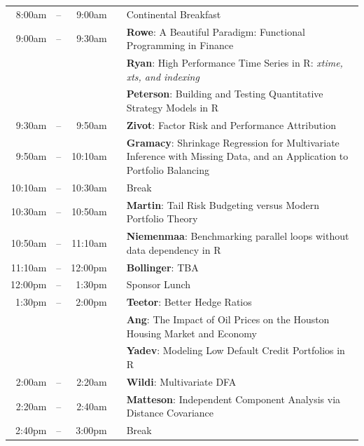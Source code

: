 \documentclass[11pt]{article}
\newcommand{\mylinecolor}[1]{\color{#1}\vspace{-8pt}}  %
\begin{document}
\begin{tabular}{rlrlp{5in}}
  8:00am  & -- &  9:00am &   & \small{\mylinecolor{Breaks} Continental Breakfast}  \\
   9:00am & -- &  9:30am &   & \textbf{\color{LightningTalk} Rowe}: \small{A Beautiful Paradigm: Functional Programming in Finance} \\
          &    &         &   & \textbf{\color{LightningTalk} Ryan}: \small{High Performance Time Series in R: \emph{xtime, xts, and indexing}} \\
          &    &         &   & \textbf{\color{LightningTalk} Peterson}: \small{Building and Testing Quantitative Strategy Models in R} \\
  9:30am  & -- &  9:50am &   & \textbf{\color{Talk} Zivot}: \small{Factor Risk and Performance Attribution} \\
  9:50am  & -- &  10:10am &   & \textbf{\color{Talk} Gramacy}: \small{Shrinkage Regression for Multivariate Inference with Missing Data,
  and an Application to Portfolio Balancing} \\
  10:10am & -- & 10:30am &   & \small{\mylinecolor{Breaks}  Break}  \\
  10:30am  & -- &  10:50am &   & \textbf{\color{Talk} Martin}: \small{Tail Risk Budgeting versus Modern Portfolio Theory} \\
  10:50am  & -- &  11:10am &   & \textbf{\color{Talk} Niemenmaa}: \small{Benchmarking parallel loops without data dependency in R} \\
  11:10am & -- & 12:00pm &   & \textbf{\color{KeynoteTalk} Bollinger}: \small{TBA} \\
  12:00pm & -- &  1:30pm &   & \small{\mylinecolor{Breaks}  Sponsor Lunch}  \\
   1:30pm & -- &  2:00pm &   & \textbf{\color{LightningTalk} Teetor}: \small{Better Hedge Ratios} \\
          &    &         &   & \textbf{\color{LightningTalk} Ang}: \small{The Impact of Oil Prices on the Houston Housing Market and Economy} \\
          &    &         &   & \textbf{\color{LightningTalk} Yadev}: \small{Modeling Low Default Credit Portfolios in R} \\
  2:00am  & -- &  2:20am &   & \textbf{\color{Talk} Wildi}: \small{Multivariate DFA} \\
  2:20am  & -- &  2:40am &   & \textbf{\color{Talk} Matteson}: \small{Independent Component Analysis via Distance Covariance} \\
   2:40pm & -- & 3:00pm  &   & \small{\mylinecolor{Breaks} Break} \\

\end{tabular}
\end{document}
